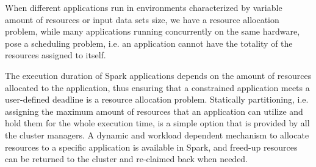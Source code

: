 
When different applications run in environments characterized by variable amount of resources or input data sets size, we have a resource allocation problem, while many applications running concurrently on the same hardware, pose a scheduling problem, i.e. an application cannot have the totality of the resources assigned to itself. 


The execution duration of Spark applications depends on the amount of resources allocated to the application, thus ensuring that a \qos constrained application meets a user-defined deadline
is a resource allocation problem. Statically partitioning, i.e. assigning the maximum amount of resources that an application can utilize and hold them for the whole execution time, is a simple option that is provided by all the cluster managers. A dynamic and workload dependent mechanism to allocate resources to a specific application is available in Spark, and freed-up resources can be returned to the cluster and re-claimed back when needed.




